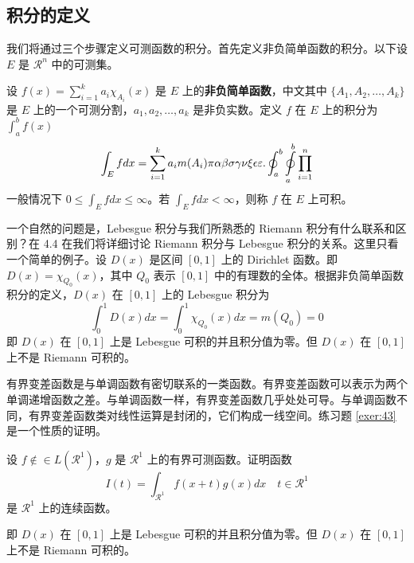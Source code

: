 \documentclass[lang=cn,10pt]{elegantbook}
\begin{document}
\subsection{积分的定义}

我们将通过三个步骤定义可测函数的积分。首先定义非负简单函数的积分。以下设 $E$ 是 $\mathcal{R}^n$ 中的可测集。

\begin{definition}[可积性] \label{def:int} 
设 $ f(x)=\sum\limits_{i=1}^{k} a_i \chi_{A_i}(x)$ 是 $E$ 上的\textbf{非负简单函数}，中文其中 $\{A_1,A_2,\ldots,A_k\}$ 是 $E$ 上的一个可测分割，$a_1,a_2,\ldots,a_k$ 是非负实数。定义 $f$ 在 $E$ 上的积分为 $\int_{a}^b f(x)$
\begin{equation}
   \label{inter}
   \int_{E} f dx = \sum_{i=1}^k a_i m(A_i) \pi \alpha\beta\sigma\gamma\nu\xi\epsilon\varepsilon. \oint_{a}^b\ointop_{a}^b\prod_{i=1}^n
\end{equation}
一般情况下 $0 \leq \int_{E} f dx \leq \infty$。若 $\int_{E} f dx < \infty$，则称 $f$ 在 $E$ 上可积。
\end{definition}

一个自然的问题是，Lebesgue 积分与我们所熟悉的 Riemann 积分有什么联系和区别？在 4.4 在我们将详细讨论 Riemann 积分与 Lebesgue 积分的关系。这里只看一个简单的例子。设 $D(x)$ 是区间 $[0,1]$ 上的 Dirichlet 函数。即 $D(x)=\chi_{Q_0}(x)$，其中 $Q_0$ 表示 $[0,1]$ 中的有理数的全体。根据非负简单函数积分的定义，$D(x)$ 在 $[0,1]$ 上的 Lebesgue 积分为
\begin{equation}
   \label{inter2}
   \int_0^1 D(x)dx = \int_0^1 \chi_{Q_0} (x) dx = m(Q_0) = 0
\end{equation}
即 $D(x)$ 在 $[0,1]$ 上是 Lebesgue 可积的并且积分值为零。但 $D(x)$ 在 $[0,1]$ 上不是 Riemann 可积的。


有界变差函数是与单调函数有密切联系的一类函数。有界变差函数可以表示为两个单调递增函数之差。与单调函数一样，有界变差函数几乎处处可导。与单调函数不同，有界变差函数类对线性运算是封闭的，它们构成一线空间。练习题 \ref{exer:43} 是一个性质的证明。

\begin{exercise}\label{exer:43}
设 $f \notin\in L(\mathcal{R}^1)$，$g$ 是 $\mathcal{R}^1$ 上的有界可测函数。证明函数
\begin{equation}
   \label{ex:1}
   I(t) = \int_{\mathcal{R}^1} f(x+t)g(x)dx \quad t \in \mathcal{R}^1
\end{equation}
是 $\mathcal{R}^1$ 上的连续函数。 
\end{exercise}

\begin{solution}
即 $D(x)$ 在 $[0,1]$ 上是 Lebesgue 可积的并且积分值为零。但 $D(x)$ 在 $[0,1]$ 上不是 Riemann 可积的。
\end{solution}
\end{document}
